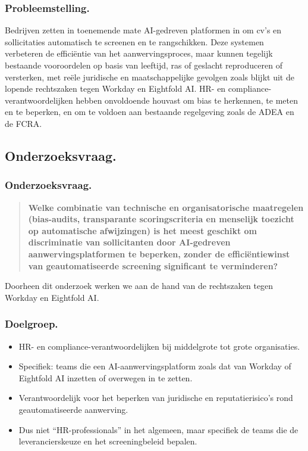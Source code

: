 \documentclass[aspectratio=169]{beamer}
\begin{document}
\begin{frame}
    \frametitle{Probleemstelling.}

    Bedrijven zetten in toenemende mate AI-gedreven platformen in om
    cv's en sollicitaties automatisch te screenen en te rangschikken.
    Deze systemen verbeteren de efficiëntie van het aanwervingsproces,
    maar kunnen tegelijk bestaande vooroordelen op basis van leeftijd,
    ras of geslacht reproduceren of versterken, met reële juridische en
    maatschappelijke gevolgen zoals blijkt uit de lopende rechtszaken
    tegen Workday en Eightfold AI. HR- en compliance-verantwoordelijken
    hebben onvoldoende houvast om bias te herkennen, te meten en te
    beperken, en om te voldoen aan bestaande regelgeving zoals de ADEA
    en de FCRA.
\end{frame}

\subsection{Onderzoeksvraag.}

\begin{frame}
    \frametitle{Onderzoeksvraag.}

      \begin{quote}
        \textbf{Welke combinatie van technische en organisatorische
        maatregelen (bias-audits, transparante scoringscriteria en
        menselijk toezicht op automatische afwijzingen) is het meest
        geschikt om discriminatie van sollicitanten door AI-gedreven
        aanwervingsplatformen te beperken, zonder de efficiëntiewinst van
        geautomatiseerde screening significant te verminderen?}
    \end{quote}
	   \text Doorheen dit onderzoek werken we aan de hand van
    de rechtszaken tegen Workday en Eightfold AI.
\end{frame}

\begin{frame}
    \frametitle{Doelgroep.}

    \begin{itemize}
        \item HR- en compliance-verantwoordelijken bij middelgrote tot
            grote organisaties.
        \item Specifiek: teams die een AI-aanwervingsplatform zoals dat
            van Workday of Eightfold AI inzetten of overwegen in te
            zetten.
        \item Verantwoordelijk voor het beperken van juridische en
            reputatierisico's rond geautomatiseerde aanwerving.
        \item Dus niet ``HR-professionals'' in het algemeen, maar
            specifiek de teams die de leverancierskeuze en het
            screeningbeleid bepalen.
    \end{itemize}
\end{frame}
\end{document}

